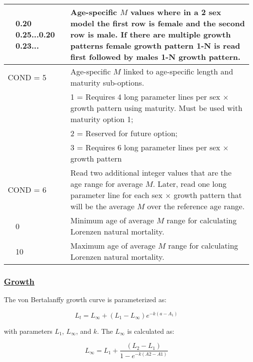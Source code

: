 \begin{longtable}{p{0.5cm} p{2cm} p{12.75cm}}
	& 0.20 0.25...0.20 0.23... & Age-specific $M$ values where in a 2 sex model the first row is female and the second row is male. If there are multiple growth patterns female growth pattern 1-N is read first followed by males 1-N growth pattern. \Bstrut\\
	\hline
	
	\multicolumn{2}{l}{COND = 5} \Tstrut & Age-specific $M$ linked to age-specific length and maturity sub-options. \\

	&  & 1 = Requires 4 long parameter lines per sex $\times$ growth pattern using maturity. Must be used with maturity option 1; \\
	&  & 2 = Reserved for future option; \\
	&  & 3 = Requires 6 long parameter lines per sex $\times$ growth pattern \Bstrut\\
	\hline

	\multicolumn{2}{l}{COND = 6} \Tstrut & Read two additional integer values that are the age range for average $M$. Later, read one long parameter line for each sex $\times$ growth pattern that will be the average $M$ over the reference age range. \\
	& 0 \Tstrut & Minimum age of average $M$ range for calculating Lorenzen natural mortality. \\
	& 10 \Tstrut & Maximum age of average $M$ range for calculating Lorenzen natural mortality. \\ 
	\hline
\end{longtable}

\hypertarget{Growth}{}
\subsubsection[Growth]{\protect\hyperlink{Growth}{Growth}}


The von Bertalanffy growth curve is parameterized as:

\begin{equation}
	L_t = L_\infty + (L_{1}-L_\infty)e^{-k(a-A_{1})}
\end{equation}

with parameters $L_{1}$, $L_\infty$, and $k$. The $L_\infty$ is calculated as:

\begin{equation}
	L_\infty = L_{1} + \frac{(L_2 - L_1)}{1-e^{-k(A2-A1)}}
\end{equation}

